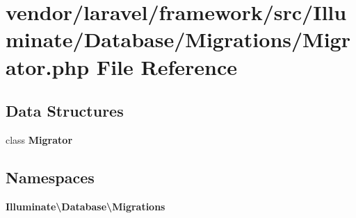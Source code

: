 \section{vendor/laravel/framework/src/\+Illuminate/\+Database/\+Migrations/\+Migrator.php File Reference}
\label{_migrator_8php}
\subsection*{Data Structures}
\begin{DoxyCompactItemize}
\item 
class {\bf Migrator}
\end{DoxyCompactItemize}
\subsection*{Namespaces}
\begin{DoxyCompactItemize}
\item 
 {\bf Illuminate\textbackslash{}\+Database\textbackslash{}\+Migrations}
\end{DoxyCompactItemize}
